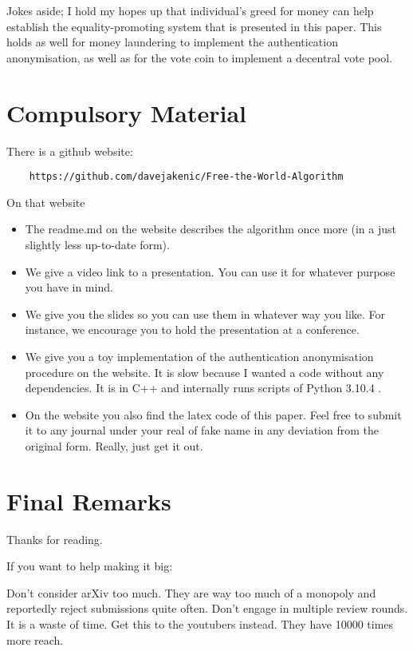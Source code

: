 \documentclass{article}
\theoremstyle{definition}
\begin{document}
	Jokes aside; I hold my hopes up that individual's greed for money can help establish the equality-promoting system that is presented in this paper. This holds as well for money laundering to implement the authentication anonymisation, as well as for the vote coin to implement a decentral vote pool.
	
	\section{Compulsory Material}
	There is a github website:
	\begin{verbatim}
	https://github.com/davejakenic/Free-the-World-Algorithm
	\end{verbatim}
	On that website
	\begin{itemize}
		\item The readme.md on the website describes the algorithm once more (in a just slightly less up-to-date form).
		\item We give a video link to a presentation. You can use it for whatever purpose you have in mind.
		\item We give you the slides so you can use them in whatever way you like. For instance, we encourage you to hold the presentation at a conference.
		\item We give you a toy implementation of the authentication anonymisation procedure on the website. It is slow because I wanted a code without any dependencies. It is in C++ and internally runs scripts of Python 3.10.4 .
		\item On the website you also find the latex code of this paper. Feel free to submit it to any journal under your real of fake name in any deviation from the original form. Really, just get it out.
	\end{itemize}
	
	\section{Final Remarks}
	Thanks for reading. 
	\vspace{3mm}
	
	\noindent
	If you want to help making it big:
	
	Don't consider arXiv too much. They are way too much of a monopoly and reportedly reject submissions quite often. Don't engage in multiple review rounds. It is a waste of time. Get this to the youtubers instead. They have 10000 times more reach.
	
\end{document}
